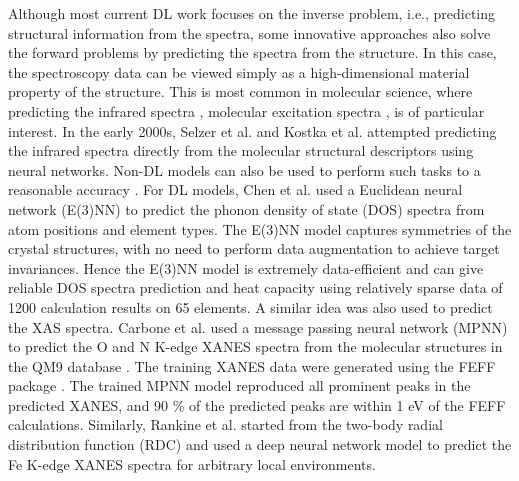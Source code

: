 \documentclass[pdflatex,sn-mathphys]{sn-jnl}%
\theoremstyle{thmstyleone}%
\theoremstyle{thmstyletwo}%
\theoremstyle{thmstylethree}%
\begin{document}
Although most current DL work focuses on the inverse problem, i.e., predicting structural information from the spectra, some innovative approaches also solve the forward problems by predicting the spectra from the structure. In this case, the spectroscopy data can be viewed simply as a high-dimensional material property of the structure. This is most common in molecular science, where predicting the infrared spectra \cite{selzer_gasteiger_thomas_salzer_2000}, molecular excitation spectra \cite{ghosh_rinke_2019}, is of particular interest. In the early 2000s, Selzer et al. \cite{selzer_gasteiger_thomas_salzer_2000} and Kostka et al. \cite{kostka_selzer_gasteiger_2001} attempted predicting the infrared spectra directly from the molecular structural descriptors using neural networks. Non-DL models can also be used to perform such tasks to a reasonable accuracy \cite{mahmoudLearningElectronicDensity2020}. For DL models, Chen et al. \cite{chenDirectPredictionPhonon2021} used a Euclidean neural network (E(3)NN) to predict the phonon density of state (DOS) spectra from atom positions and element types. The E(3)NN model captures symmetries of the crystal structures, with no need to perform data augmentation to achieve target invariances. Hence the E(3)NN model is extremely data-efficient and can give reliable DOS spectra prediction and heat capacity using relatively sparse data of 1200 calculation results on 65 elements. A similar idea was also used to predict the XAS spectra. Carbone et al. \cite{carboneMachineLearningXRayAbsorption2020a} used a message passing neural network (MPNN) to predict the O and N K-edge XANES spectra from the molecular structures in the QM9 database \cite{ramakrishnan2014quantum}. The training XANES data were generated using the FEFF package \cite{rehrParameterfreeCalculationsXray2010}. The trained MPNN model reproduced all prominent peaks in the predicted XANES, and 90 \% of the predicted peaks are within 1 eV of the FEFF calculations. Similarly, Rankine et al. \cite{rankineDeepNeuralNetwork2020} started from the two-body radial distribution function (RDC) and used a deep neural network model to predict the Fe K-edge XANES spectra for arbitrary local environments. 
\end{document}
